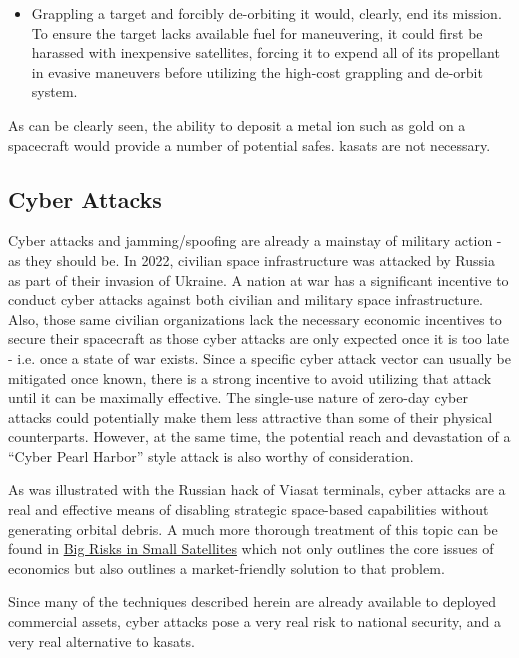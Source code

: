 \begin{itemize}
\item Grappling a target and forcibly de-orbiting it would, clearly,
  end its mission.  To ensure the target lacks available fuel for
  maneuvering, it could first be harassed with inexpensive satellites,
  forcing it to expend all of its propellant in evasive maneuvers
  before utilizing the high-cost grappling and de-orbit system.

\end{itemize}

As can be clearly seen, the ability to deposit a metal ion such as
gold on a spacecraft would provide a number of potential \acp{safe}.
\acp{kasat} are not necessary.


\subsection{Cyber Attacks}

Cyber attacks and jamming/spoofing are already a mainstay of military
action - as they should be.  In 2022, civilian space infrastructure
was attacked by Russia as part of their invasion of Ukraine.  A nation
at war has a significant incentive to conduct cyber attacks against
both civilian and military space infrastructure.\cite{big-risks} Also,
those same civilian organizations lack the necessary economic
incentives to secure their spacecraft as those cyber attacks are only
expected once it is too late - i.e. once a state of war exists.  Since
a specific cyber attack vector can usually be mitigated once known,
there is a strong incentive to avoid utilizing that attack until it
can be maximally effective.  The single-use nature of zero-day cyber
attacks could potentially make them less attractive than some of their
physical counterparts.  However, at the same time, the potential reach
and devastation of a ``Cyber Pearl Harbor'' style attack is also
worthy of consideration.

As was illustrated with the Russian hack of Viasat terminals, cyber
attacks are a real and effective means of disabling strategic
space-based capabilities without generating orbital debris.  A much
more thorough treatment of this topic can be found in
\href{https://www.researchgate.net/publication/341435541_Big_Risks_in_Small_Satellites_-_The_Need_for_Secure_Infrastructure_as_a_Service}{Big
  Risks in Small Satellites} which not only outlines the core issues
of economics but also outlines a market-friendly solution to that
problem.

Since many of the techniques described herein are already available to
deployed commercial assets, cyber attacks pose a very real risk to
national security, and a very real alternative to \acp{kasat}.


